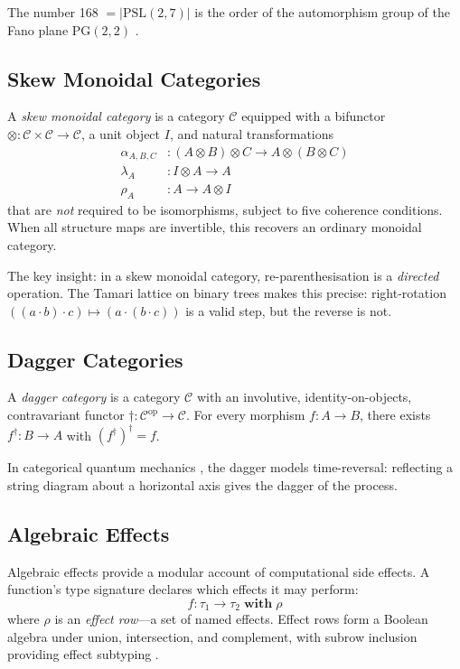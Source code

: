 \documentclass[11pt,a4paper]{article}
\theoremstyle{definition}
\theoremstyle{remark}
\newcommand{\PG}{\mathrm{PG}}
\newcommand{\PSL}{\mathrm{PSL}}
\newcommand{\dagop}{{\dagger}}
\begin{document}
The number 168 $= |\PSL(2,7)|$ is the order of the automorphism group
of the Fano plane $\PG(2,2)$ \cite{baez2002octonions}.

\subsection{Skew Monoidal Categories}

A \emph{skew monoidal category} \cite{szlachanyi2012,lackstreet2012}
is a category $\mathcal{C}$ equipped with a bifunctor
$\otimes: \mathcal{C} \times \mathcal{C} \to \mathcal{C}$, a unit
object $I$, and natural transformations
\begin{align*}
  \alpha_{A,B,C} &: (A \otimes B) \otimes C \to A \otimes (B \otimes C) \\
  \lambda_A &: I \otimes A \to A \\
  \rho_A &: A \to A \otimes I
\end{align*}
that are \emph{not} required to be isomorphisms, subject to five
coherence conditions. When all structure maps are invertible, this
recovers an ordinary monoidal category.

The key insight: in a skew monoidal category, re-parenthesisation is a
\emph{directed} operation. The Tamari lattice \cite{tamari1962} on
binary trees makes this precise: right-rotation
$((a \cdot b) \cdot c) \mapsto (a \cdot (b \cdot c))$ is a valid step,
but the reverse is not.

\subsection{Dagger Categories}

A \emph{dagger category} \cite{selinger2007} is a category
$\mathcal{C}$ with an involutive, identity-on-objects, contravariant
functor $\dagop: \mathcal{C}^{\mathrm{op}} \to \mathcal{C}$. For every
morphism $f: A \to B$, there exists $f^\dagop: B \to A$ with
$(f^\dagop)^\dagop = f$.

In categorical quantum mechanics \cite{abramsky2004}, the dagger
models time-reversal: reflecting a string diagram about a horizontal
axis gives the dagger of the process.

\subsection{Algebraic Effects}

Algebraic effects \cite{plotkin2009} provide a modular account of
computational side effects. A function's type signature declares which
effects it may perform:
\[
  f: \tau_1 \to \tau_2 \;\mathbf{with}\; \rho
\]
where $\rho$ is an \emph{effect row}---a set of named effects. Effect
rows form a Boolean algebra under union, intersection, and complement,
with subrow inclusion providing effect subtyping
\cite{leijen2014,lindley2012}.
\end{document}
